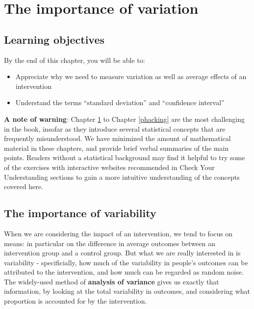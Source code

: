 \documentclass{krantz}
\providecommand{\tightlist}{%
\setlength{\itemsep}{0pt}\setlength{\parskip}{0pt}}
\begin{document}
\hypertarget{variation}{%
\chapter{The importance of variation}\label{variation}}

\hypertarget{learning-objectives-9}{%
\section{Learning objectives}\label{learning-objectives-9}}

By the end of this chapter, you will be able to:

\begin{itemize}
\tightlist
\item
  Appreciate why we need to measure variation as well as average effects of an intervention\\
\item
  Understand the terms ``standard deviation'' and ``confidence interval''
\end{itemize}

\textbf{A note of warning}: Chapter \ref{variation} to Chapter \ref{phacking} are the most challenging in the book, insofar as they introduce several statistical concepts that are frequently misunderstood. We have minimized the amount of mathematical material in these chapters, and provide brief verbal summaries of the main points. Readers without a statistical background may find it helpful to try some of the exercises with interactive websites recommended in Check Your Understanding sections to gain a more intuitive understanding of the concepts covered here.

\hypertarget{the-importance-of-variability}{%
\section{The importance of variability}\label{the-importance-of-variability}}

When we are considering the impact of an intervention, we tend to focus on means: in particular on the difference in average outcomes between an intervention group and a control group. But what we are really interested in is variability - specificially, how much of the variability in people's outcomes can be attributed to the intervention, and how much can be regarded as random noise. The widely-used method of \textbf{analysis of variance} gives us exactly that information, by looking at the total variability in outcomes, and considering what proportion is accounted for by the intervention.
\end{document}
